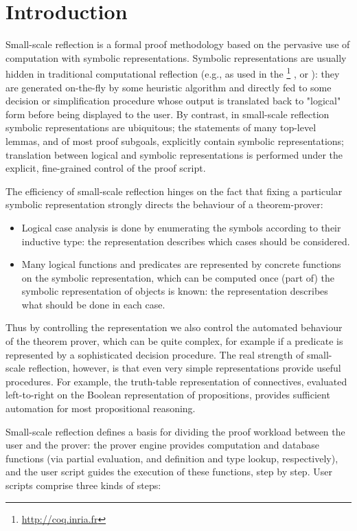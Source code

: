 \section{Introduction}\label{sec:intro}
Small-scale reflection is a formal proof methodology based on the
pervasive use of computation with symbolic representations. Symbolic
representations are usually hidden in traditional computational
reflection (e.g., as used in the
\Coq{}\footnote{\url{http://coq.inria.fr}} , or ):
they are generated on-the-fly by some heuristic algorithm and directly
fed to some decision or simplification procedure whose output is
translated back to "logical" form before being displayed to the
user. By contrast, in small-scale reflection symbolic representations
are ubiquitous; the statements of many top-level lemmas, and of most
proof subgoals, explicitly contain symbolic representations;
translation between logical and symbolic representations is performed
under the explicit, fine-grained control of the proof script.

The efficiency of small-scale reflection hinges on the fact that
fixing a particular symbolic representation strongly directs the
behaviour of a theorem-prover:

\begin{itemize}
\item Logical case analysis is done by
enumerating the symbols according to their inductive type: the
representation describes which cases should be considered.
\item Many
logical functions and predicates are represented by concrete
functions on the symbolic representation, which can be computed once
(part of) the symbolic representation of objects is known: the
representation describes what should be done in each case.
\end{itemize}

Thus by controlling the representation we also control the automated
behaviour of the theorem prover, which can be quite complex,
for example if a predicate is represented by a sophisticated decision
procedure. The real strength of small-scale reflection, however, is
that even very simple representations provide useful procedures. For
example, the truth-table representation of connectives, evaluated
left-to-right
on the Boolean representation of propositions, provides sufficient
automation for most propositional reasoning.

Small-scale reflection defines a basis for dividing the proof workload
between the user and the prover: the prover engine provides computation
and database functions (via partial evaluation, and definition and
type lookup, respectively), and the user script guides the execution
of these functions, step by step. User scripts comprise three kinds of
steps:

